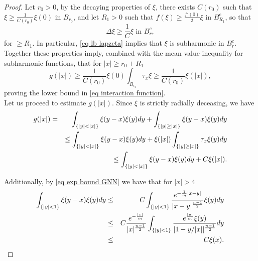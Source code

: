 \documentclass[11pt,letterpaper,reqno]{amsart}
\theoremstyle{plain}%
\theoremstyle{definition}
\numberwithin{equation}{section}
\numberwithin{figure}{section}
\begin{document}
\begin{proof}
	
Let $r_0>0$, by the decaying properties of $\xi$, there exists $C(r_0)$ such that $\xi \geq \frac{1}{C(r_0)}\xi(0)$ in $B_{r_0}$, and let $R_1 >0$ such that $f(\xi)\geq \frac{f'(0)}{2}\xi$ in $B_{R_1}^c$, so that
	\begin{equation}\label{eq lb lapzeta}
		 \Delta \xi \geq \frac{1}{C} \xi \mbox{ in $B_r^c$},
	\end{equation}
    for $\geq R_1$. In particular, \eqref{eq lb lapzeta} implies that $\xi$ is subharmonic in $B_r^c$. Together these properties imply, combined with the mean value inequality for subharmonic functions, that for $|x| \geq r_0+R_1$
	\begin{equation}\label{eq lb interaction}
	g(|x|) \geq \frac{1}{C(r_0)}\xi(0) \int_{B_{r_0}} \tau_{x}\xi \geq \frac{1}{C(r_0)} \xi(|x|),
\end{equation}
proving the lower bound in \eqref{eq interaction function}.\\
	
	Let us proceed to estimate $g(|x|)$. Since $\xi$ is strictly radially deceasing, we have
	\begin{eqnarray}\notag
	 g(|x|) &=& \int_{\{|y| < |x|\}} \xi(y-x) \xi(y)dy + \int_{\{|y| \geq |x|\}}\xi(y-x) \xi(y)dy\\\notag
	 && \leq  \int_{\{|y| < |x|\}} \xi(y-x) \xi(y)dy+\xi(|x|)\int_{\{|y| \geq |x|\}} \tau_{x}\xi(y)dy\\\label{eq bd pairwise1}
	 && \leq \int_{\{|y| < |x|\}} \xi(y-x) \xi(y)dy+C\xi(|x|).
	\end{eqnarray}
	
	Additionally, by  \eqref{eq exp bound GNN} we have that for $|x|>4$
	\begin{eqnarray}\notag
		\int_{\{|y| < 1\}} \xi(y-x) \xi(y)dy &\leq& 	C	\int_{\{|y| < 1\}} \frac{e^{-\frac{1}{m}|x-y|}}{|x-y|^\frac{n-1}{2}}\xi(y)dy\\ \notag
		&\leq& C \frac{e^{-\frac{|x|}{m}}}{|x|^\frac{n-1}{2}}	\int_{\{|y| < 1\}} \frac{e^{\frac{|y|}{m}}\xi(y)}{|1-y/|x||^\frac{n-1}{2}}dy\\\label{eq bound ring0}
		&\leq& C \xi(x).
	\end{eqnarray}
	

\end{proof}
\end{document}
